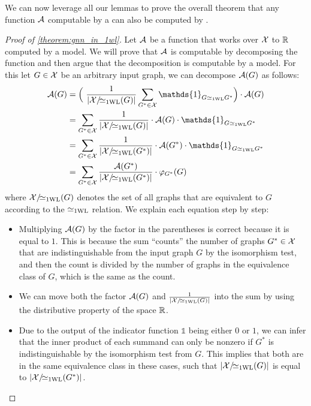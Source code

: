 We can now leverage all our lemmas to prove the overall theorem that any function $\mathcal{A}$ computable by a \gnn can also be computed by \wlnn.
\begin{proof}[Proof of \cref{theorem:gnn_in_1wl}]\label{prof:gnn_in_1wl}
    Let $\mathcal{A}$ be a function that works over $\mathcal{X}$ to $\mathbb{R}$ computed by a \gnn model. We will prove that $\mathcal{A}$ is \wlnn computable by decomposing the function and then argue that the decomposition is computable by a \wlnn model. For this let $G \in \mathcal{X}$ be an arbitrary input graph, we can decompose $\mathcal{A}(G)$ as follows:
    \begin{align}
        \cA(G) &= \Bigl( \ \frac{1}{|\cX/\!{\wliso}(G)|}\sum_{G^* \in \cX} \mathds{1}_{G \wliso G^*} \Bigr) \cdot \cA(G) \label{eq:gnn_decomposition1}\\
        &= \sum_{G^* \in \cX} \frac{1}{|\cX/\!{\wliso}(G)|} \cdot \cA(G) \cdot \mathds{1}_{G \wliso G^*} \label{eq:gnn_decomposition2}\\
        &= \sum_{G^* \in \cX} \frac{1}{|\cX/\!{\wliso}(G^*)|} \cdot \cA(G^*) \cdot \mathds{1}_{G \wliso G^*} \label{eq:gnn_decomposition3}\\
        &= \sum_{G^* \in \cX} \frac{\cA(G^*)}{|\cX/\!{\wliso}(G^*)|}  \cdot \varphi_{G^*}(G) \label{eq:gnn_decomposition4}
    \end{align}
    where $\mathcal{X}/\!{\simeq_{\text{1WL}}}(G)$ denotes the set of all graphs that are equivalent to $G$ according to the $\simeq_{\text{1WL}}$ relation. We explain each equation step by step:
    \begin{itemize}[leftmargin=9em]
        \item[\cref*{eq:gnn_decomposition1}:] Multiplying $\mathcal{A}(G)$ by the factor in the parentheses is correct because it is equal to $1$. This is because the sum ``counts'' the number of graphs $G^* \in \mathcal{X}$ that are indistinguishable from the input graph $G$ by the \wl isomorphism test, and then the count is divided by the number of graphs in the equivalence class of $G$, which is the same as the count.
        \item[\cref*{eq:gnn_decomposition2}:] We can move both the factor $\mathcal{A}(G)$ and $\frac{1}{|\mathcal{X}/\!{\simeq_{\text{1WL}}}(G)|}$ into the sum by using the distributive property of the space $\mathbb{R}$.     
        \item[\cref*{eq:gnn_decomposition3}:] Due to the output of the indicator function $\mathds{1}$ being either $0$ or $1$, we can infer that the inner product of each summand can only be nonzero if $G^*$ is indistinguishable by the \wl isomorphism test from $G$. This implies that both are in the same equivalence class in these cases, such that $|\mathcal{X}/\!{\simeq_{\text{1WL}}}(G)|$ is equal to $|\mathcal{X}/\!{\simeq_{\text{1WL}}}(G^*)|$.\\

\end{itemize}
\end{proof}
